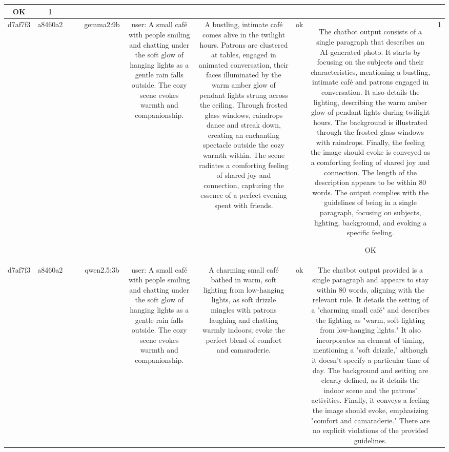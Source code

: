 \begin{table}[h!]
\begin{tabular}{|c|c|c|c|c|c|c|c|c|c|}
OK & 1\\
\hline
d7af7f3 & a8460a2 &  &  & gemma2:9b & user: A small café with people smiling and chatting under the soft glow of hanging lights as a gentle rain falls outside. The cozy scene evokes warmth and companionship. & A bustling, intimate café comes alive in the twilight hours. Patrons are clustered at tables, engaged in animated conversation, their faces illuminated by the warm amber glow of pendant lights strung across the ceiling. Through frosted glass windows, raindrops dance and streak down, creating an enchanting spectacle outside the cozy warmth within. The scene radiates a comforting feeling of shared joy and connection, capturing the essence of a perfect evening spent with friends. 


 & ok & The chatbot output consists of a single paragraph that describes an AI-generated photo. It starts by focusing on the subjects and their characteristics, mentioning a bustling, intimate café and patrons engaged in conversation. It also details the lighting, describing the warm amber glow of pendant lights during twilight hours. The background is illustrated through the frosted glass windows with raindrops. Finally, the feeling the image should evoke is conveyed as a comforting feeling of shared joy and connection. The length of the description appears to be within 80 words. The output complies with the guidelines of being in a single paragraph, focusing on subjects, lighting, background, and evoking a specific feeling.

OK & 1\\
\hline
d7af7f3 & a8460a2 &  &  & qwen2.5:3b & user: A small café with people smiling and chatting under the soft glow of hanging lights as a gentle rain falls outside. The cozy scene evokes warmth and companionship. & A charming small café bathed in warm, soft lighting from low-hanging lights, as soft drizzle mingles with patrons laughing and chatting warmly indoors; evoke the perfect blend of comfort and camaraderie. & ok & The chatbot output provided is a single paragraph and appears to stay within 80 words, aligning with the relevant rule. It details the setting of a "charming small café" and describes the lighting as "warm, soft lighting from low-hanging lights." It also incorporates an element of timing, mentioning a "soft drizzle," although it doesn't specify a particular time of day. The background and setting are clearly defined, as it details the indoor scene and the patrons' activities. Finally, it conveys a feeling the image should evoke, emphasizing "comfort and camaraderie." There are no explicit violations of the provided guidelines. 


\end{tabular}
\end{table}
